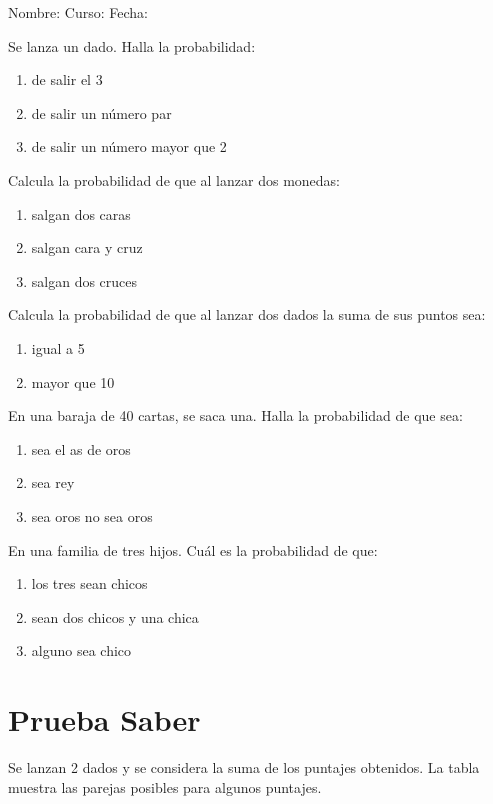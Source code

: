 \documentclass[letterpaper,fleqn]{article}
\newcommand{\LineaNombre}{%
\par
\vspace{\baselineskip}
Nombre:\hrulefill \; Curso: \underline{\hspace*{48pt}} \; Fecha: \underline{\hspace*{2.5cm}} \relax
\par}
\begin{document}
\LineaNombre
\begin{enumerate}
 \item Se lanza un dado. Halla la probabilidad:
 \begin{enumerate}
 \item de salir el 3 \noanswer
 \item de salir un número par \noanswer
 \item de salir un número mayor que 2 \noanswer
 \end{enumerate}
 \item Calcula la probabilidad de que al lanzar dos monedas:
 \begin{enumerate}
 \item salgan dos caras \noanswer
 \item salgan cara y cruz \noanswer 
 \item salgan dos cruces \noanswer
 \end{enumerate}
 \item Calcula la probabilidad de que al lanzar dos dados la suma de sus puntos sea:
 \begin{enumerate}
 \item igual a 5 \noanswer 
 \item mayor que 10 \noanswer
 \end{enumerate}
 \item En una baraja de 40 cartas, se saca una. Halla la probabilidad de que sea:
 \begin{enumerate}
 \item sea el as de oros  \noanswer
 \item sea rey \noanswer 
 \item sea oros no sea oros \noanswer
 \end{enumerate}
 \item En una familia de tres hijos. Cuál es la probabilidad de que:
 \begin{enumerate}
 \item los tres sean chicos \noanswer 
 \item sean dos chicos y una chica \noanswer 
 \item alguno sea chico \noanswer
 \end{enumerate}
 \section*{Prueba Saber}
 \begin{minipage}{.35\textwidth}
\item Se lanzan 2 dados y se considera la suma de los puntajes obtenidos. La tabla muestra las parejas posibles para algunos puntajes.  \\


\end{minipage}
\end{enumerate}
\end{document}
